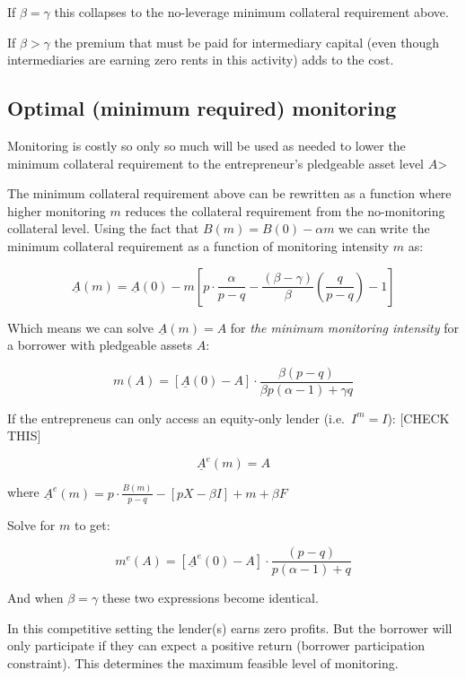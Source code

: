 \documentclass[11pt]{article}
\def\gt{>}
\begin{document}
If \(\beta=\gamma\) this collapses to the no-leverage minimum collateral
requirement above.

If \(\beta \gt \gamma\) the premium that must be paid for intermediary
capital (even though intermediaries are earning zero rents in this
activity) adds to the cost.

    \subsection{Optimal (minimum required)
monitoring}\label{optimal-minimum-required-monitoring}

Monitoring is costly so only so much will be used as needed to lower the
minimum collateral requirement to the entrepreneur's pledgeable asset
level \(A\)\textgreater{}

    The minimum collateral requirement above can be rewritten as a function
where higher monitoring \(m\) reduces the collateral requirement from
the no-monitoring collateral level. Using the fact that
\(B(m) = B(0) - \alpha m\) we can write the minimum collateral
requirement as a function of monitoring intensity \(m\) as:

\[\underline A (m) = \underline A (0) 
  - m \left [ p \cdot \frac{\alpha}{p-q} - \frac{(\beta - \gamma)}{\beta} \left( \frac{q}{p-q} \right ) -1 \right ]\]

    Which means we can solve \(\underline A (m) = A\) for \emph{the minimum
monitoring intensity} for a borrower with pledgeable assets \(A\):

\[m(A) = \left[ \underline A(0)  - A \right] \cdot
    \frac{\beta(p-q)}{\beta p(\alpha - 1)+\gamma q}\]

    If the entrepreneus can only access an equity-only lender
(i.e.~\(I^m=I\)): {[}CHECK THIS{]}

\[\underline A^e(m) = A\]

where
\(\underline A^e(m) =  p \cdot \frac{B(m)}{p-q} - \left[ {pX - \beta I} \right] + m + \beta F\)

Solve for \(m\) to get:

\[m^e(A) = \left[ \underline A^e(0)  - A \right] \cdot
    \frac{(p-q)}{ p(\alpha-1)+ q}\]

And when \(\beta=\gamma\) these two expressions become identical.

    In this competitive setting the lender(s) earns zero profits. But the
borrower will only participate if they can expect a positive return
(borrower participation constraint). This determines the maximum
feasible level of monitoring.
\end{document}
